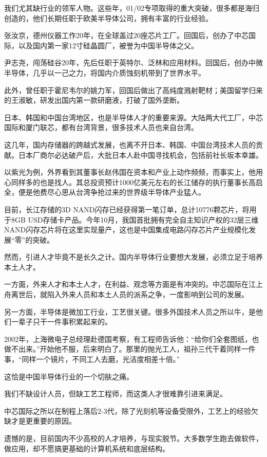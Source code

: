 \documentclass[utf8]{book}
\begin{document}
	我们尤其缺行业的领军人物。这些年，01/02专项取得的重大突破，很多都是海归创造的，他们长期任职于欧美半导体公司，拥有丰富的行业经验。
	
	张汝京，德州仪器工作20年，在全球盖过20座芯片工厂。回国后，创办了中芯国际，以及国内第一家12寸硅晶圆厂，被誉为中国半导体之父。
	
	尹志尧，闯荡硅谷20年，先后任职于英特尔、泛林和应用材料。回国后，创办中微半导体，几乎以一己之力，将国内介质蚀刻机带到了世界水平。
	
	此外，曾任职于霍尼韦尔的姚力军，回国后做出了高纯度溅射靶材；美国留学归来的王淑敏，研发出国内第一款研磨液，打破了国外垄断。
	
	日本、韩国和中国台湾地区，也是半导体人才的重要来源。大陆两大代工厂，中芯国际和厦门联芯，都有台湾背景，很多技术人员也来自台湾。
	
	这几年，国内存储器的跨越式发展，也离不开日本、韩国、中国台湾技术人员的贡献。日本厂商尔必达破产后，大批日本人赴中国寻找机会，包括前社长坂本幸雄。
	
	以紫光为例，外界看到其董事长赵伟国在资本和产业上动作频频，而事实上，他用心同样多的也是找人。其总投资预计1000亿美元左右的长江储存的执行董事长高启全，便是他费尽心思从台湾争抢过来的世界级半导体产业猛人。
	
	目前，长江存储的3D NAND闪存已经获得第一笔订单，总计10776颗芯片，将用于8GB USD存储卡产品。今年10月，我国首批拥有完全自主知识产权的32层三维NAND闪存芯片将在这里实现量产，这也是中国集成电路闪存芯片产业规模化发展“零”的突破。
	
	然而，引进人才毕竟不是长久之计。国内半导体行业要想大发展，必须立足于培养本土人才。
	
	一方面，外来人才和本土人才，在利益、观念等方面是有冲突的。中芯国际在江上舟离世后，就陷入外来人员和本土人员的派系之争，一度影响到公司的发展。
	
	另一方面，半导体是微加工行业，工艺很关键。很多外国技术人员之所以牛，是他们一辈子只干一件事积累起来的。
	
	2002年，上海微电子总经理赴德国考察，有工程师告诉他：“给你们全套图纸，也做不出来。”开始他不服，后来明白了。那里的抛光工人，祖孙三代干着同样一件事，“同样一个镜片，不同工人去磨，光洁度相差十倍。”
	
	这恰是中国半导体行业的一个切肤之痛。
	
	我们不缺设计人员，但缺工艺工程师，而这类人才很难靠引进来满足。
	
	中芯国际之所以在制程上落后2-3代，除了光刻机等设备受限外，工艺上的经验欠缺才是更重要的原因。
	
	遗憾的是，目前国内不少高校的人才培养，与现实脱节。大多数学生跑去做软件，做应用，却不愿搞更基础的计算机系统和底层结构。
	
\end{document}
